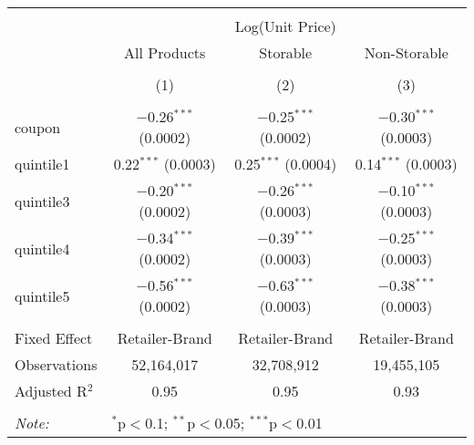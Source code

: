 
\begin{table}[!htbp] \centering 
  \caption{} 
  \label{tab:overallSavings} 
\begin{tabular}{@{\extracolsep{5pt}}lccc} 
\\[-1.8ex]\hline 
\hline \\[-1.8ex] 
 & \multicolumn{3}{c}{Log(Unit Price)} \\ 
\cline{2-4} 
 & All Products & Storable & Non-Storable \\ 
\\[-1.8ex] & (1) & (2) & (3)\\ 
\hline \\[-1.8ex] 
 coupon & $-$0.26$^{***}$ (0.0002) & $-$0.25$^{***}$ (0.0002) & $-$0.30$^{***}$ (0.0003) \\ 
  quintile1 & 0.22$^{***}$ (0.0003) & 0.25$^{***}$ (0.0004) & 0.14$^{***}$ (0.0003) \\ 
  quintile3 & $-$0.20$^{***}$ (0.0002) & $-$0.26$^{***}$ (0.0003) & $-$0.10$^{***}$ (0.0003) \\ 
  quintile4 & $-$0.34$^{***}$ (0.0002) & $-$0.39$^{***}$ (0.0003) & $-$0.25$^{***}$ (0.0003) \\ 
  quintile5 & $-$0.56$^{***}$ (0.0002) & $-$0.63$^{***}$ (0.0003) & $-$0.38$^{***}$ (0.0003) \\ 
 \hline \\[-1.8ex] 
Fixed Effect & Retailer-Brand & Retailer-Brand & Retailer-Brand \\ 
Observations & 52,164,017 & 32,708,912 & 19,455,105 \\ 
Adjusted R$^{2}$ & 0.95 & 0.95 & 0.93 \\ 
\hline 
\hline \\[-1.8ex] 
\textit{Note:}  & \multicolumn{3}{l}{$^{*}$p$<$0.1; $^{**}$p$<$0.05; $^{***}$p$<$0.01} \\ 
\end{tabular} 
\end{table} 
